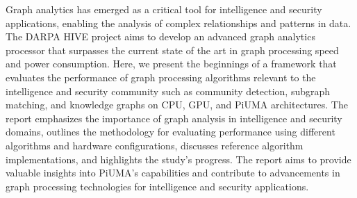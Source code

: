 \documentclass[letterpaper, 10pt]{article}
\begin{document}
\abstractname{}
\par{\setlength{\parindent}{20pt}
Graph analytics has emerged as a critical tool for intelligence and security applications, enabling the analysis of complex relationships and patterns in data. 
The DARPA HIVE project aims to develop an advanced graph analytics processor that surpasses the current state of the art in graph processing speed and power consumption. 
Here, we present the beginnings of a framework that evaluates the performance of graph processing algorithms relevant to the intelligence and security community such as community detection, subgraph matching, and knowledge graphs on CPU, GPU, and PiUMA architectures. 
The report emphasizes the importance of graph analysis in intelligence and security domains, outlines the methodology for evaluating performance using different algorithms and hardware configurations, discusses reference algorithm implementations, and highlights the study's progress. 
The report aims to provide valuable insights into PiUMA's capabilities and contribute to advancements in graph processing technologies for intelligence and security applications.}
\end{document}

